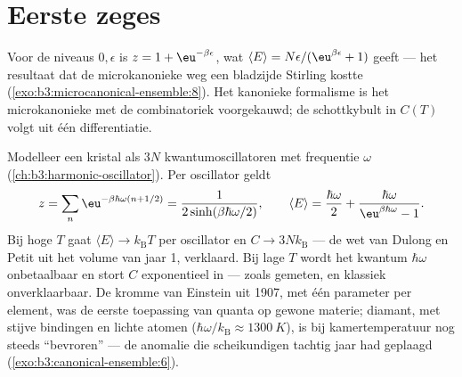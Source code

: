 \section{Eerste zeges}

\begin{example}\label{ex:b3:canonical-ensemble:twolevel}
Voor de niveaus $0, \epsilon$ is $z = 1 + \eu^{-\beta\epsilon}$, wat
$\langle E\rangle = N\epsilon/(\eu^{\beta\epsilon} + 1)$ geeft --- het
resultaat dat de microkanonieke weg een bladzijde Stirling kostte
(\cref{exo:b3:microcanonical-ensemble:8}). Het kanonieke formalisme is het
microkanonieke met de combinatoriek voorgekauwd; de schottkybult in $C(T)$
volgt uit één differentiatie.
\end{example}

\begin{example}\label{ex:b3:canonical-ensemble:einstein}
Modelleer een kristal als $3N$ kwantumoscillatoren met frequentie $\omega$
(\cref{ch:b3:harmonic-oscillator}). Per oscillator geldt
\[
z = \sum_n\eu^{-\beta\hbar\omega(n + 1/2)}
 = \frac{1}{2\sinh(\beta\hbar\omega/2)} , \qquad
\langle E\rangle = \frac{\hbar\omega}{2} +
\frac{\hbar\omega}{\eu^{\beta\hbar\omega} - 1} .
\]
Bij hoge $T$ gaat $\langle E\rangle \to k_{\text{B}}T$ per oscillator en
$C \to 3Nk_{\text{B}}$ --- de wet van Dulong en Petit uit het volume van
jaar 1, verklaard. Bij lage $T$ wordt het kwantum $\hbar\omega$
onbetaalbaar en stort $C$ exponentieel in --- zoals gemeten, en klassiek
onverklaarbaar. De kromme van Einstein uit 1907, met één parameter per
element, was de eerste toepassing van quanta op gewone materie; diamant,
met stijve bindingen en lichte atomen ($\hbar\omega/k_{\text{B}}
\approx \qty{1300}{K}$), is bij kamertemperatuur nog steeds ``bevroren'' --- de
anomalie die scheikundigen tachtig jaar had geplaagd
(\cref{exo:b3:canonical-ensemble:6}).
\end{example}

